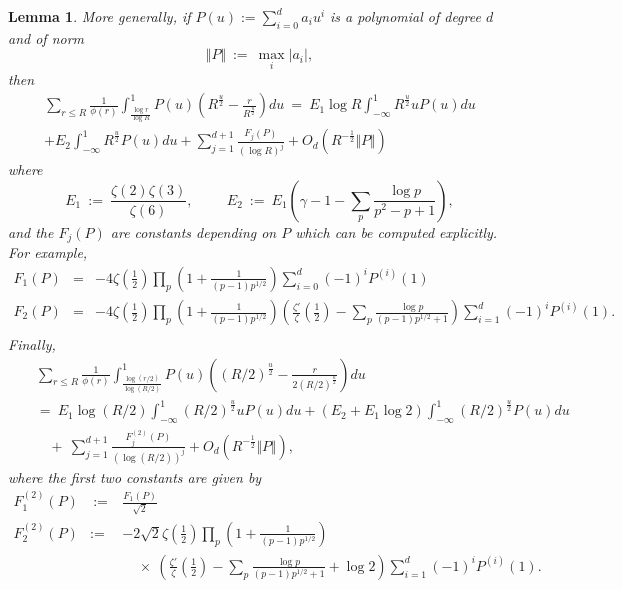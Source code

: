 \documentclass[12pt,reqno]{amsart}
\numberwithin{equation}{section}
\theoremstyle{plain}
\newtheorem{lemma}[thm]{Lemma}
\begin{document}
\begin{lemma}
More generally, if $P(u):=\sum_{i=0}^d a_i u^i$ is a polynomial of degree $d$ and of norm \begin{equation} \Vert P\Vert \ :=\ \max_{i} |a_i|,\end{equation} then
\begin{multline}  \sum_{r\leq R} \frac 1{\phi(r)} \int_{\frac{\log r}{\log R}} ^1 P(u) \left(R^{\frac u2} -\frac r{R^{\frac u2}} \right)du
\ = \ E_1 \log R  \int_{-\infty}^1 R^{\frac u2}uP(u)du \\+ E_2 \int_{-\infty}^1 R^{\frac u2}P(u)du
+ \sum_{j=1}^{d+1} \frac{F_j(P)}{(\log R)^j}  +O_d(R^{-\frac 12}\Vert P\Vert)
\label{sum reciprocal totient equation general}
\end{multline}
where
\begin{equation}
E_1 \ := \  \frac{\zeta(2)\zeta(3)}{\zeta(6)}, \hspace{1cm} E_2  \ := \ E_1 \left( \gamma-1-\sum_p \frac{\log p}{p^2-p+1} \right),
\label{equation definition E_i}
\end{equation}
and the $F_j(P)$ are constants depending on $P$ which can be computed explicitly.
For example,
\begin{eqnarray} F_1(P) & = &  -4\zeta\left( \frac 12\right) \prod_p \left( 1+\frac 1{(p-1)p^{1/2}}\right) \sum_{i=0}^d (-1)^i P^{(i)}(1) \nonumber\\
 F_2(P) &=&  -4\zeta\left( \frac 12\right) \prod_p \left( 1+\frac 1{(p-1)p^{1/2}}\right) \left( \frac{\zeta'}{\zeta}\left( \frac 12 \right)-\sum_p \frac{\log p}{(p-1)p^{1/2} +1} \right) \sum_{i=1}^d (-1)^i P^{(i)}(1). \nonumber\\ \end{eqnarray}
Finally,
\begin{eqnarray} & &  \sum_{r\leq R} \frac 1{\phi(r)} \int_{\frac{\log (r/2)}{\log (R/2)}}^1 P(u) \left((R/2)^{\frac u2} -\frac r{2(R/2)^{\frac u2}} \right)du
\nonumber\\ & &  = \ E_1 \log (R/2)  \int_{-\infty}^1 (R/2)^{\frac u2}uP(u)du
+ (E_2+E_1\log 2) \int_{-\infty}^1 (R/2)^{\frac u2}P(u)du \nonumber\\
& & \ \ \ \ +\ \sum_{j=1}^{d+1} \frac{F_j^{(2)}(P)}{(\log (R/2))^j}  +O_d(R^{-\frac 12}\Vert P\Vert),
\label{sum reciprocal totient equation general 2}
\end{eqnarray}
where the first two constants are given by
\begin{eqnarray} F_1^{(2)}(P) & \ :=  \ & \frac{F_1(P)}{\sqrt 2} \nonumber\\
F_2^{(2)}(P) &:= & -2\sqrt 2\zeta\left( \frac 12\right) \prod_p \left( 1+\frac 1{(p-1)p^{1/2}}\right)\nonumber\\
& & \ \ \ \ \  \times\ \left( \frac{\zeta'}{\zeta}\left( \frac 12 \right)-\sum_p \frac{\log p}{(p-1)p^{1/2} +1}+\log 2 \right) \sum_{i=1}^d (-1)^i P^{(i)}(1).
\end{eqnarray}

\end{lemma}
\end{document}
